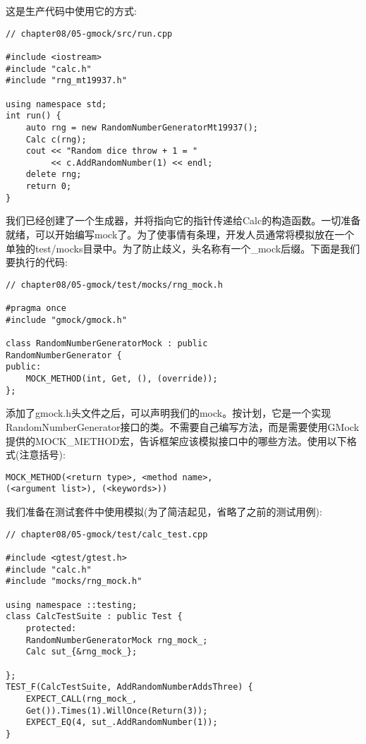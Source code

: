 这是生产代码中使用它的方式:

\begin{lstlisting}[style=styleCXX]
// chapter08/05-gmock/src/run.cpp

#include <iostream>
#include "calc.h"
#include "rng_mt19937.h"

using namespace std;
int run() {
	auto rng = new RandomNumberGeneratorMt19937();
	Calc c(rng);
	cout << "Random dice throw + 1 = "
		 << c.AddRandomNumber(1) << endl;
	delete rng;
	return 0;
}
\end{lstlisting}

我们已经创建了一个生成器，并将指向它的指针传递给Calc的构造函数。一切准备就绪，可以开始编写mock了。为了使事情有条理，开发人员通常将模拟放在一个单独的test/mocks目录中。为了防止歧义，头名称有一个\_mock后缀。下面是我们要执行的代码:

\begin{lstlisting}[style=styleCXX]
// chapter08/05-gmock/test/mocks/rng_mock.h

#pragma once
#include "gmock/gmock.h"

class RandomNumberGeneratorMock : public
RandomNumberGenerator {
public:
	MOCK_METHOD(int, Get, (), (override));
};
\end{lstlisting}

添加了gmock.h头文件之后，可以声明我们的mock。按计划，它是一个实现RandomNumberGenerator接口的类。不需要自己编写方法，而是需要使用GMock提供的MOCK\_METHOD宏，告诉框架应该模拟接口中的哪些方法。使用以下格式(注意括号):

\begin{lstlisting}[style=styleCXX]
MOCK_METHOD(<return type>, <method name>,
(<argument list>), (<keywords>))
\end{lstlisting}

我们准备在测试套件中使用模拟(为了简洁起见，省略了之前的测试用例):

\begin{lstlisting}[style=styleCXX]
// chapter08/05-gmock/test/calc_test.cpp

#include <gtest/gtest.h>
#include "calc.h"
#include "mocks/rng_mock.h"

using namespace ::testing;
class CalcTestSuite : public Test {
	protected:
	RandomNumberGeneratorMock rng_mock_;
	Calc sut_{&rng_mock_};

};
TEST_F(CalcTestSuite, AddRandomNumberAddsThree) {
	EXPECT_CALL(rng_mock_,
	Get()).Times(1).WillOnce(Return(3));
	EXPECT_EQ(4, sut_.AddRandomNumber(1));
}
\end{lstlisting}

